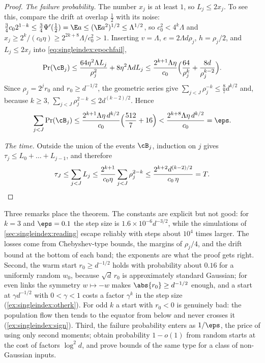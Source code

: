 \begin{refsection}
\begin{proof}
\emph{The failure probability.} The number $x_j$ is at least $1$, so $L_j\le2x_j$. To see this, compare the drift at overlap $\frac12$ with its noise: $\frac34c_02^{1-k}\le\frac34\Psi'(\frac12)=\E a\le(\E a^2)^{1/2}\le\Lambda^{1/2}$, so $c_0^2<4^k\Lambda$ and $x_j\ge2^k/(c_0\eta)\ge2^{2k+8}\Lambda/c_0^2>1$. Inserting $v=\Lambda$, $e=2\Lambda d\rho_j$, $h=\rho_j/2$, and $L_j\le2x_j$ into \eqref{eq:singleindex:epochfail},
\[
  \Pr(\cB_j)\le\frac{64\eta^2\Lambda L_j}{\rho_j^2}+8\eta^2\Lambda dL_j\le\frac{2^{k+1}\Lambda\eta}{c_0}\Bigl(\frac{64}{\rho_j^k}+\frac{8d}{\rho_j^{k-2}}\Bigr).
\]
Since $\rho_j=2^jr_0$ and $r_0\ge d^{-1/2}$, the geometric series give $\sum_{j<J}\rho_j^{-k}\le\frac87d^{k/2}$ and, because $k\ge3$, $\sum_{j<J}\rho_j^{2-k}\le2d^{(k-2)/2}$. Hence
\[
  \sum_{j<J}\Pr(\cB_j)\le\frac{2^{k+1}\Lambda\eta\,d^{k/2}}{c_0}\Bigl(\frac{512}{7}+16\Bigr)<\frac{2^{k+8}\Lambda\eta\,d^{k/2}}{c_0}=\eps .
\]

\emph{The time.} Outside the union of the events $\cB_j$, induction on $j$ gives $\tau_j\le L_0+\dots+L_{j-1}$, and therefore
\[
  \tau_J\le\sum_{j<J}L_j\le\frac{2^{k+1}}{c_0\eta}\sum_{j<J}\rho_j^{2-k}\le\frac{2^{k+2}d^{(k-2)/2}}{c_0\,\eta}=T .\qedhere
\]
\end{proof}

Three remarks place the theorem. The constants are explicit but not good: for $k=3$ and $\eps=0.1$ the step size is $1.6\times10^{-6}d^{-3/2}$, while the simulations of \cref{sec:singleindex:reading} escape reliably with steps about $10^4$ times larger. The losses come from Chebyshev-type bounds, the margins of $\rho_j/4$, and the drift bound at the bottom of each band; the exponents are what the proof gets right. Second, the warm start $r_0\ge d^{-1/2}$ holds with probability about $0.16$ for a uniformly random $w_0$, because $\sqrt d\,r_0$ is approximately standard Gaussian; for even links the symmetry $w\mapsto-w$ makes $\abs{r_0}\ge d^{-1/2}$ enough, and a start at $\gamma d^{-1/2}$ with $0<\gamma<1$ costs a factor $\gamma^k$ in the step size (\cref{ex:singleindex:otherk}). For odd $k$ a start with $r_0<0$ is genuinely bad: the population flow then tends to the equator from below and never crosses it (\cref{ex:singleindex:sign}). Third, the failure probability enters as $1/\eps$, the price of using only second moments; \textcite{BenArousGheissariJagannath2021} obtain probability $1-o(1)$ from random starts at the cost of factors $\log^2d$, and \textcite{ZweigEtAl2023} prove bounds of the same type for a class of non-Gaussian inputs.


\end{refsection}
